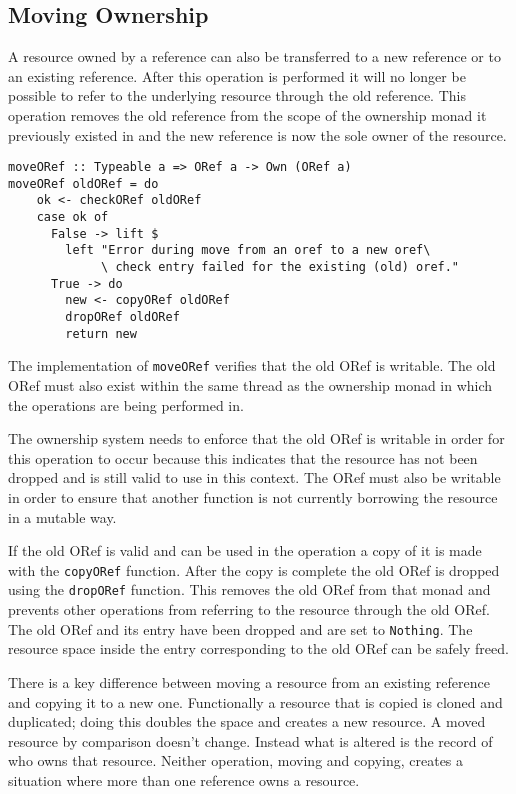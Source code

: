 \documentclass[onehalf,11pt]{beavtex}
\begin{document}
\subsection{Moving Ownership}

A resource owned by a reference can also be transferred to a new reference or
to an existing reference. After this operation is performed it will no longer
be possible to refer to the underlying resource through the old reference. This
operation removes the old reference from the scope of the ownership monad it
previously existed in and the new reference is now the sole owner of the
resource.

\begin{verbatim}
moveORef :: Typeable a => ORef a -> Own (ORef a)
moveORef oldORef = do
    ok <- checkORef oldORef
    case ok of
      False -> lift $
        left "Error during move from an oref to a new oref\
             \ check entry failed for the existing (old) oref."
      True -> do
        new <- copyORef oldORef
        dropORef oldORef
        return new
\end{verbatim}

The implementation of \texttt{moveORef} verifies that the old ORef is writable.
The old ORef must also exist within the same thread as the ownership monad in
which the operations are being performed in.

The ownership system needs to enforce that the old ORef is
writable in order for this operation to occur because this indicates that the
resource has not been dropped and is still valid to use in this context.
The ORef must also be writable in order to ensure that another function
is not currently borrowing the resource in a mutable way.

If the old ORef is valid and can be used in the operation a copy of it is made
with the \texttt{copyORef} function.  After the copy is complete the old ORef
is dropped using the \texttt{dropORef} function. This removes the old ORef from
that monad and prevents other operations from referring to the resource through
the old ORef.
The old ORef and its entry have been dropped and are set to \texttt{Nothing}.
The resource space inside the entry corresponding to the old ORef can be safely
freed.

There is a key difference between moving a resource from an existing reference
and copying it to a new one.  Functionally a resource that is copied is cloned
and duplicated; doing this doubles the space and creates a new resource.
A moved resource by comparison doesn't change.  Instead what is altered is the
record of who owns that resource.  Neither operation, moving and copying,
creates a situation where more than one reference owns a resource.
\end{document}
